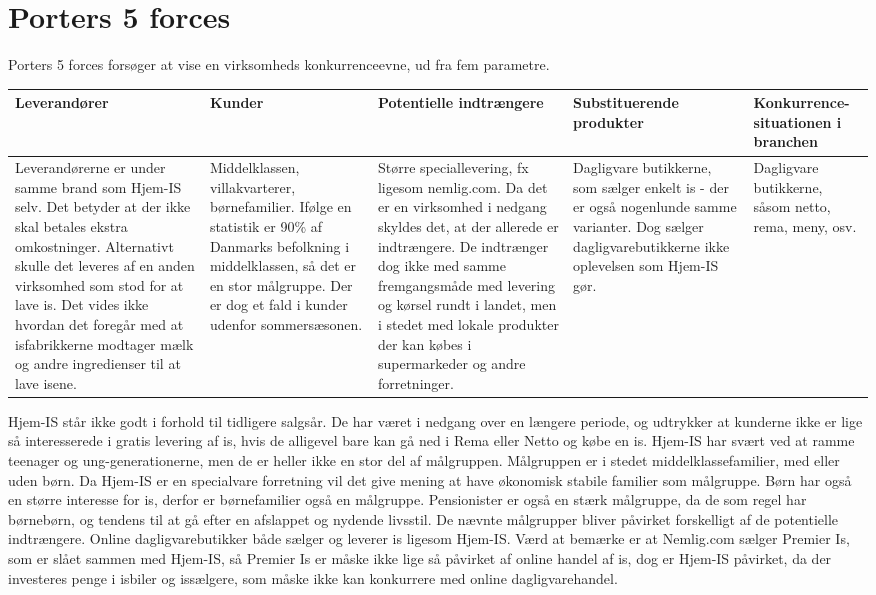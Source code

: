 \section{Porters 5 forces}
Porters 5 forces\cite{Organisation} forsøger at vise en virksomheds konkurrenceevne, ud fra fem parametre. 
\begin{center}
\begin{tabular}{ |p{80pt}|p{80pt}|p{80pt}|p{80pt}|p{80pt}| }
   \hline
   Leverandører & Kunder & Potentielle indtrængere & Substituerende produkter & Konkurrence-situationen i branchen \\
   \hline\hline
   Leverandørerne er under samme brand som Hjem-IS selv. Det betyder at der ikke skal betales ekstra omkostninger. Alternativt skulle det leveres af en anden virksomhed som stod for at lave is.
	Det vides ikke hvordan det foregår med at isfabrikkerne modtager mælk og andre ingredienser til at lave isene.
	&
	Middelklassen, villakvarterer, børnefamilier.
	Ifølge en statistik er 90\% af Danmarks befolkning i middelklassen, så det er en stor målgruppe. Der er dog et fald i kunder udenfor sommersæsonen.
	&
	Større speciallevering, fx ligesom nemlig.com.
	Da det er en virksomhed i nedgang skyldes det, at der allerede er indtrængere. De indtrænger dog ikke med samme fremgangsmåde med levering og kørsel rundt i landet, men i stedet med lokale produkter der kan købes i supermarkeder og andre forretninger.
	&
	Dagligvare butikkerne, som sælger enkelt is - der er også nogenlunde samme varianter. Dog sælger dagligvarebutikkerne ikke oplevelsen som Hjem-IS gør.
	&
	Dagligvare butikkerne, såsom netto, rema, meny, osv.
	\\
	\hline
\end{tabular}
\end{center}

Hjem-IS står ikke godt i forhold til tidligere salgsår. De har været i nedgang over en længere periode, og udtrykker at kunderne ikke er lige så interesserede i gratis levering af is, hvis de alligevel bare kan gå ned i Rema eller Netto og købe en is. Hjem-IS har svært ved at ramme teenager og ung-generationerne, men de er heller ikke en stor del af målgruppen. Målgruppen er i stedet middelklassefamilier, med eller uden børn. Da Hjem-IS er en specialvare forretning vil det give mening at have økonomisk stabile familier som målgruppe. Børn har også en større interesse for is, derfor er børnefamilier også en målgruppe. Pensionister er også en stærk målgruppe, da de som regel har børnebørn, og tendens til at gå efter en afslappet og nydende livsstil. 
De nævnte målgrupper bliver påvirket forskelligt af de potentielle indtrængere. Online dagligvarebutikker både sælger og leverer is ligesom Hjem-IS. Værd at bemærke er at Nemlig.com sælger Premier Is, som er slået sammen med Hjem-IS, så Premier Is er måske ikke lige så påvirket af online handel af is, dog er Hjem-IS påvirket, da der investeres penge i isbiler og issælgere, som måske ikke kan konkurrere med online dagligvarehandel.

